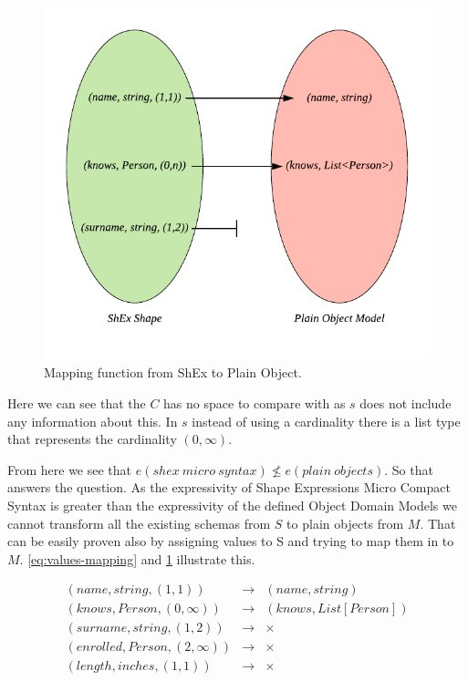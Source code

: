 \begin{figure}
    \includegraphics[scale=1]{images/shex-lite-mapping.pdf}
    \centering
    \caption[Mapping function from ShEx to Plain Object]{Mapping function from ShEx to Plain Object.}
    \label{fig:mapping-f}
\end{figure}

Here we can see that the $C$ has no space to compare with as $s$ does not include any information about this.
In $s$ instead of using a cardinality there is a list type that represents the cardinality $(0, \infty)$.

From here we see that $e(shex\ micro\ syntax) \not\leq e(plain\ objects)$. So that answers the question.
As the expressivity of Shape Expressions Micro Compact Syntax is greater than the expressivity of the
defined Object Domain Models we cannot transform all the existing schemas from $S$ to plain objects from $M$.
That can be easily proven also by assigning values to S and trying to map them in to $M$. \cref{eq:values-mapping}
and \cref{fig:mapping-f} illustrate this.

\begin{equation}\label{eq:values-mapping}
    \begin{aligned}
(name,string,(1,1)) & \rightarrow & (name,string)\\
(knows,Person,(0,\infty)) & \rightarrow & (knows,List[Person])\\
(surname,string,(1,2)) & \rightarrow & \times \\
(enrolled,Person,(2,\infty)) & \rightarrow & \times \\
(length,inches,(1,1)) & \rightarrow & \times  
    \end{aligned}
\end{equation}

